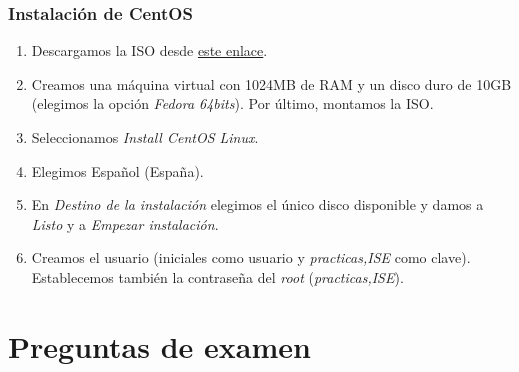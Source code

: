\documentclass[12pt,spanish]{article}
\begin{document}
\subsubsection{Instalación de CentOS}
\begin{enumerate}
	\item Descargamos la ISO desde \href{http://atcproyectos.ugr.es/esriie/ubuntu-16.04.5-server-amd64.iso}{este enlace}.
	\item Creamos una máquina virtual con 1024MB de RAM y un disco duro de 10GB (elegimos la opción \textit{Fedora 64bits}). Por último, montamos la ISO.
	\item Seleccionamos \textit{Install CentOS Linux}.
	\item Elegimos Español (España).
	\item En \textit{Destino de la instalación} elegimos el único disco disponible y damos a \textit{Listo} y a \textit{Empezar instalación}.
	\item Creamos el usuario (iniciales como usuario y \textit{practicas,ISE} como clave). Establecemos también la contraseña del \textit{root} (\textit{practicas,ISE}).
\end{enumerate}

\section{Preguntas de examen}
\end{document}
